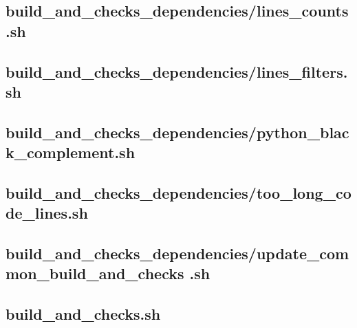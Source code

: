 \documentclass{article}
\begin{document}


\subsection{
  build\_and\_checks\_dependencies/lines\_counts.sh
}
\label{
  build_and_checks_dependencies:lines_countssh
}



\subsection{
  build\_and\_checks\_dependencies/lines\_filters.sh
}
\label{
  build_and_checks_dependencies:lines_filterssh
}



\subsection{
  build\_and\_checks\_dependencies/python\_black\_complement.sh
}
\label{
  build_and_checks_dependencies:python_black_complementsh
}



\subsection{
  build\_and\_checks\_dependencies/too\_long\_code\_lines.sh
}
\label{
  build_and_checks_dependencies:too_long_code_linessh
}



\subsection{
  build\_and\_checks\_dependencies/update\_common\_build\_and\_checks%
.sh
}
\label{
  build_and_checks_dependencies:update_common_build_and_checkssh
}



\subsection{
  build\_and\_checks.sh
}
\label{
  build_and_checkssh
}
\end{document}
